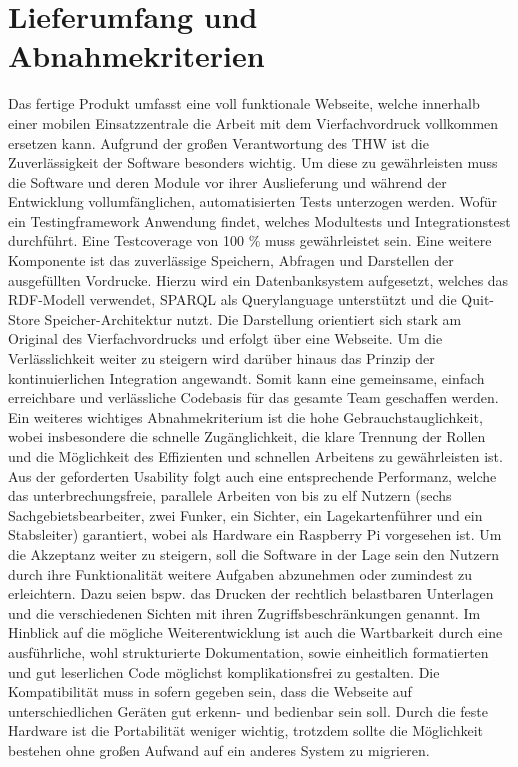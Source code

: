 \section{Lieferumfang und Abnahmekriterien}
Das fertige Produkt umfasst eine voll funktionale Webseite, welche innerhalb einer mobilen Einsatzzentrale die Arbeit mit dem Vierfachvordruck vollkommen ersetzen kann. Aufgrund der großen Verantwortung des THW ist die Zuverlässigkeit der Software besonders wichtig. Um diese zu gewährleisten muss die Software und deren Module vor ihrer Auslieferung und während der Entwicklung vollumfänglichen, automatisierten Tests unterzogen werden. Wofür ein Testingframework Anwendung findet, welches Modultests und Integrationstest durchführt. Eine Testcoverage von 100 \% muss gewährleistet sein. Eine weitere Komponente ist das zuverlässige Speichern, Abfragen und Darstellen der ausgefüllten Vordrucke. Hierzu wird ein Datenbanksystem aufgesetzt, welches das RDF-Modell verwendet, SPARQL als Querylanguage unterstützt und die Quit-Store Speicher-Architektur nutzt. Die Darstellung orientiert sich stark am Original des Vierfachvordrucks und erfolgt über eine Webseite. Um die Verlässlichkeit weiter zu steigern wird darüber hinaus das Prinzip der kontinuierlichen Integration angewandt. Somit kann eine gemeinsame, einfach erreichbare und verlässliche Codebasis für das gesamte Team geschaffen werden. Ein weiteres wichtiges Abnahmekriterium ist die hohe Gebrauchstauglichkeit, wobei insbesondere die schnelle Zugänglichkeit, die klare Trennung der Rollen und die Möglichkeit des Effizienten und schnellen Arbeitens zu gewährleisten ist. Aus der geforderten Usability folgt auch eine entsprechende Performanz, welche das unterbrechungsfreie, parallele Arbeiten von bis zu elf Nutzern (sechs Sachgebietsbearbeiter, zwei Funker, ein Sichter, ein Lagekartenführer und ein Stabsleiter) garantiert, wobei als Hardware ein Raspberry Pi vorgesehen ist. Um die Akzeptanz weiter zu steigern, soll die Software in der Lage sein den Nutzern durch ihre Funktionalität weitere Aufgaben abzunehmen oder zumindest zu erleichtern. Dazu seien bspw. das Drucken der rechtlich belastbaren Unterlagen und die verschiedenen Sichten mit ihren Zugriffsbeschränkungen genannt. Im Hinblick auf die mögliche Weiterentwicklung ist auch die Wartbarkeit durch eine ausführliche, wohl strukturierte Dokumentation, sowie einheitlich formatierten und gut leserlichen Code möglichst komplikationsfrei zu gestalten. Die Kompatibilität muss in sofern gegeben sein, dass die Webseite auf unterschiedlichen Geräten gut erkenn- und bedienbar sein soll. Durch die feste Hardware ist die Portabilität weniger wichtig, trotzdem sollte die Möglichkeit bestehen ohne großen Aufwand auf ein anderes System zu migrieren. 